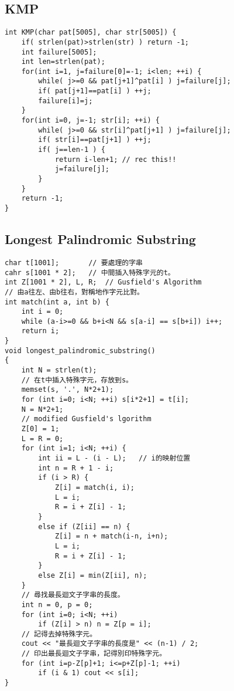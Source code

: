 \documentclass[11pt,twocolumn,a4paper]{article}
\begin{document}
\subsection{KMP}
\begin{lstlisting}[label=KMP]
int KMP(char pat[5005], char str[5005]) {
	if( strlen(pat)>strlen(str) ) return -1;
	int failure[5005];
	int len=strlen(pat);
	for(int i=1, j=failure[0]=-1; i<len; ++i) {
		while( j>=0 && pat[j+1]^pat[i] ) j=failure[j];
		if( pat[j+1]==pat[i] ) ++j;
		failure[i]=j;
	}
	for(int i=0, j=-1; str[i]; ++i) {
		while( j>=0 && str[i]^pat[j+1] ) j=failure[j];
		if( str[i]==pat[j+1] ) ++j;
		if( j==len-1 ) {
			return i-len+1; // rec this!!
			j=failure[j];
		}
	}
	return -1;
}
\end{lstlisting}

\subsection{Longest Palindromic Substring}
\begin{lstlisting}[label=Longest Palindromic Substring]
char t[1001];		// 要處理的字串
cahr s[1001 * 2];	// 中間插入特殊字元的t。
int Z[1001 * 2], L, R;	// Gusfield's Algorithm
// 由a往左、由b往右，對稱地作字元比對。
int match(int a, int b) {
	int i = 0;
	while (a-i>=0 && b+i<N && s[a-i] == s[b+i]) i++;
	return i;
}
void longest_palindromic_substring()
{
	int N = strlen(t);
	// 在t中插入特殊字元，存放到s。
	memset(s, '.', N*2+1);
	for (int i=0; i<N; ++i) s[i*2+1] = t[i];
	N = N*2+1;
	// modified Gusfield's lgorithm
	Z[0] = 1;
	L = R = 0;
	for (int i=1; i<N; ++i) {
		int ii = L - (i - L);   // i的映射位置
		int n = R + 1 - i;
		if (i > R) {
			Z[i] = match(i, i);
			L = i;
			R = i + Z[i] - 1;
		}
		else if (Z[ii] == n) {
			Z[i] = n + match(i-n, i+n);
			L = i;
			R = i + Z[i] - 1;
		}
		else Z[i] = min(Z[ii], n);
	}
	// 尋找最長迴文子字串的長度。
	int n = 0, p = 0;
	for (int i=0; i<N; ++i)
		if (Z[i] > n) n = Z[p = i];
	// 記得去掉特殊字元。
	cout << "最長迴文子字串的長度是" << (n-1) / 2;
	// 印出最長迴文子字串，記得別印特殊字元。
	for (int i=p-Z[p]+1; i<=p+Z[p]-1; ++i)
		if (i & 1) cout << s[i];
}
\end{lstlisting}
\end{document}
